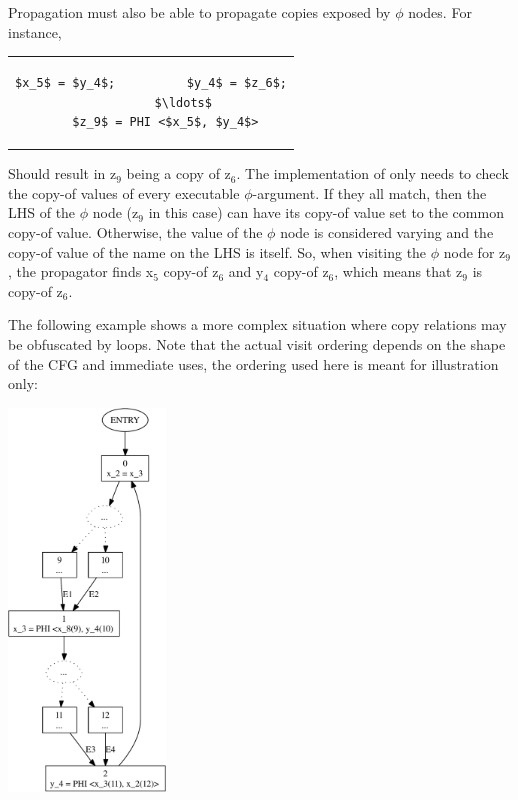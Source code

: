 Propagation must also be able to propagate copies exposed by
$\phi$ nodes.  For instance,

\begin{center}
  \begin{tabular}{c}
    \begin{lstlisting}
$x_5$ = $y_4$;          $y_4$ = $z_6$;
         $\ldots$
    $z_9$ = PHI <$x_5$, $y_4$>
    \end{lstlisting}
  \end{tabular}
\end{center}

Should result in z$_9$ being a copy of z$_6$.  The implementation
of  only needs to check the copy-of
values of every executable $\phi$-argument.  If they all match,
then the LHS of the $\phi$ node (z$_9$ in this case) can have its
copy-of value set to the common copy-of value.  Otherwise, the
value of the $\phi$ node is considered varying and the copy-of
value of the name on the LHS is itself.  So, when visiting the
$\phi$ node for z$_9$, the propagator finds x$_5$ copy-of z$_6$
and y$_4$ copy-of z$_6$, which means that z$_9$ is copy-of z$_6$.

The following example shows a more complex situation where copy
relations may be obfuscated by loops.  Note that the actual visit
ordering depends on the shape of the CFG and immediate uses, the
ordering used here is meant for illustration only:

\begin{center}
\parbox{2in}{\includegraphics[height=4in]{copy-prop-3}}
\end{center}

